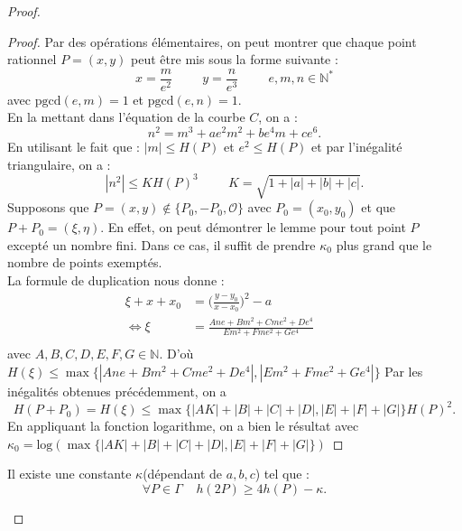 \documentclass[a4paper]{article}
\begin{document}
\begin{proof}
\begin{proof}
Par des opérations élémentaires, on peut montrer que chaque point rationnel $P=(x,y)$ peut être mis sous la forme suivante :
\begin{equation*} 
x=\frac{m}{e^2} \hspace{1cm} y=\frac{n}{e^3} \hspace{1cm} e,m,n \in \mathbb{N^*} 
\end{equation*}
avec $\text{pgcd}(e,m)=1$ et $\text{pgcd}(e,n)=1$. \\
En la mettant dans l'équation de la courbe $C$, on a :
\begin{equation*}
n^2=m^3+ae^2m^2+be^4m+ce^6.
\end{equation*}
En utilisant le fait que :
$| m | \leqslant H(P)$ et $e^2 \leqslant H(P)$
et par l'inégalité triangulaire, on a :
\begin{equation*}
| n^2 | \leqslant K H(P)^3   \hspace{1cm} K=\sqrt{1+|a|+|b|+|c|}.
\end{equation*}
Supposons que $P=(x,y) \notin \{P_{0},-P_{0},\mathcal{O} \}$ avec $ P_{0}=(x_{0},y_{0})$ et que $P+P_{0}=(\xi,\eta)$.
En effet, on peut démontrer le lemme pour tout point $P$ excepté un nombre fini. Dans ce cas, il suffit de prendre $\kappa_{0}$ plus grand que le nombre de points exemptés. \\
La formule de duplication nous donne :
\begin{align*}
\xi+x+x_{0}&=\Big(\frac{y-y_{0}}{x-x_{0}}\Big)^2-a \\
\iff \xi&= \frac{Ane+Bm^2+Cme^2+De^4}{Em^2+Fme^2+Ge^4} \hspace{1cm}       \\ 
\end{align*}
avec $A,B,C,D,E,F,G \in \mathbb{N}$.  
D'où $H(\xi) \leqslant \max\{| Ane+Bm^2+Cme^2+De^4 |, | Em^2+Fme^2+Ge^4 | \}$
Par les inégalités obtenues précédemment, on a
\begin{equation*}
H(P+P_{0})=H(\xi)\leqslant \max \{| AK | + | B | + | C |+| D |, | E | + | F | + | G |\}H(P)^2.
\end{equation*}
En appliquant la fonction logarithme, on a bien le résultat avec
$
\kappa_{0}=\text{log}(\max \{| AK | + | B | + | C |+| D |, | E | + | F | + | G |\})$
\end{proof}

\begin{lem} \label{lem3}
Il existe une constante $\kappa$(dépendant de $a,b,c$) tel que :
\begin{equation*}
\forall P \in \Gamma \; \; \; \;  h(2P) \geqslant 4h(P) - \kappa.
\end{equation*}
\end{lem}


\end{proof}
\end{document}

